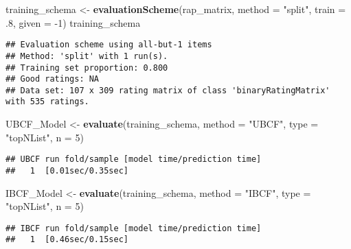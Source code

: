 \documentclass[
]{article}
\newenvironment{Shaded}{\begin{snugshade}}{\end{snugshade}}
\newcommand{\DataTypeTok}[1]{\textcolor[rgb]{0.13,0.29,0.53}{#1}}
\newcommand{\DecValTok}[1]{\textcolor[rgb]{0.00,0.00,0.81}{#1}}
\newcommand{\FloatTok}[1]{\textcolor[rgb]{0.00,0.00,0.81}{#1}}
\newcommand{\KeywordTok}[1]{\textcolor[rgb]{0.13,0.29,0.53}{\textbf{#1}}}
\newcommand{\NormalTok}[1]{#1}
\newcommand{\OperatorTok}[1]{\textcolor[rgb]{0.81,0.36,0.00}{\textbf{#1}}}
\newcommand{\StringTok}[1]{\textcolor[rgb]{0.31,0.60,0.02}{#1}}
\begin{document}
\begin{Shaded}
\begin{Highlighting}[]
\NormalTok{training_schema <-}\StringTok{ }\KeywordTok{evaluationScheme}\NormalTok{(rap_matrix, }\DataTypeTok{method =} \StringTok{"split"}\NormalTok{, }\DataTypeTok{train =} \FloatTok{.8}\NormalTok{, }\DataTypeTok{given =} \DecValTok{-1}\NormalTok{)}
\NormalTok{training_schema}
\end{Highlighting}
\end{Shaded}

\begin{verbatim}
## Evaluation scheme using all-but-1 items
## Method: 'split' with 1 run(s).
## Training set proportion: 0.800
## Good ratings: NA
## Data set: 107 x 309 rating matrix of class 'binaryRatingMatrix' with 535 ratings.
\end{verbatim}

\begin{Shaded}
\begin{Highlighting}[]
\NormalTok{UBCF_Model <-}\StringTok{ }\KeywordTok{evaluate}\NormalTok{(training_schema, }\DataTypeTok{method =} \StringTok{"UBCF"}\NormalTok{, }\DataTypeTok{type =} \StringTok{"topNList"}\NormalTok{, }\DataTypeTok{n =} \DecValTok{5}\NormalTok{)}
\end{Highlighting}
\end{Shaded}

\begin{verbatim}
## UBCF run fold/sample [model time/prediction time]
##   1  [0.01sec/0.35sec]
\end{verbatim}

\begin{Shaded}
\begin{Highlighting}[]
\NormalTok{IBCF_Model <-}\StringTok{ }\KeywordTok{evaluate}\NormalTok{(training_schema, }\DataTypeTok{method =} \StringTok{"IBCF"}\NormalTok{, }\DataTypeTok{type =} \StringTok{"topNList"}\NormalTok{, }\DataTypeTok{n =} \DecValTok{5}\NormalTok{)}
\end{Highlighting}
\end{Shaded}

\begin{verbatim}
## IBCF run fold/sample [model time/prediction time]
##   1  [0.46sec/0.15sec]
\end{verbatim}

\begin{Shaded}
\end{Shaded}
\end{document}
